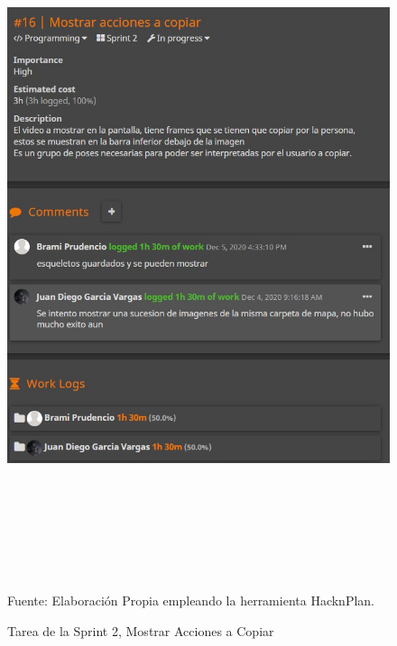 \newpage
\begin{figure}[t!]
	\centering
	\includegraphics[width=15cm,height=20cm,]{./Images/tareaexample.jpg}
	\caption{Tarea de la Sprint 2, Mostrar Acciones a Copiar}
	\footnotesize Fuente: Elaboración Propia empleando la herramienta HacknPlan.
	\label{sprinttarea}
\end{figure}




